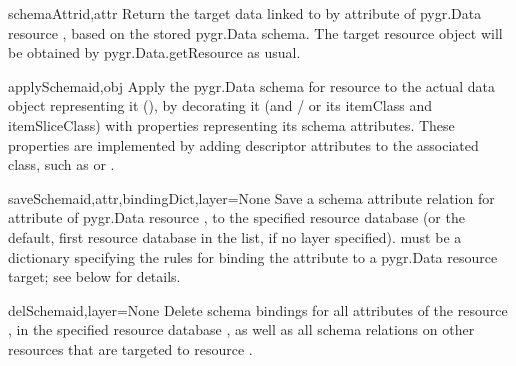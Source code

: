 \documentclass{howto}
\begin{document}
\begin{funcdesc}{schemaAttr}{id,attr}
  Return the target data linked to by attribute  of pygr.Data
  resource , based on the stored pygr.Data schema.  The target resource
  object will be obtained by pygr.Data.getResource as usual.
\end{funcdesc}

\begin{funcdesc}{applySchema}{id,obj}
  Apply the pygr.Data schema for resource  to the actual data
  object representing it (), by decorating it (and / or its itemClass
  and itemSliceClass) with properties representing its schema attributes.
  These properties are implemented by adding descriptor attributes to the
  associated class, such as  or .
\end{funcdesc}

\begin{funcdesc}{saveSchema}{id,attr,bindingDict,layer=None}
  Save a schema attribute relation for attribute  of pygr.Data
  resource , to the specified resource database  (or the default,
  first resource database in the list, if no layer specified).
   must be a dictionary specifying the rules for
  binding the attribute to a pygr.Data resource target; see below for details.
\end{funcdesc}

\begin{funcdesc}{delSchema}{id,layer=None}
  Delete schema bindings for all attributes of the resource , in
  the specified resource database , as well as all schema relations
  on other resources that are targeted to resource .
\end{funcdesc}
\end{document}
